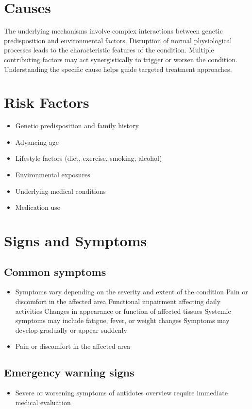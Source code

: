 \section{Causes}
The underlying mechanisms involve complex interactions between genetic predisposition and environmental factors. Disruption of normal physiological processes leads to the characteristic features of the condition. Multiple contributing factors may act synergistically to trigger or worsen the condition. Understanding the specific cause helps guide targeted treatment approaches.
\section{Risk Factors}


\begin{itemize}[noitemsep]
  \item Genetic predisposition and family history
  \item Advancing age
  \item Lifestyle factors (diet, exercise, smoking, alcohol)
  \item Environmental exposures
  \item Underlying medical conditions
  \item Medication use
\end{itemize}
\section{Signs and Symptoms}

\subsection{Common symptoms}
\begin{itemize}[noitemsep]
  \item Symptoms vary depending on the severity and extent of the condition Pain or discomfort in the affected area Functional impairment affecting daily activities Changes in appearance or function of affected tissues Systemic symptoms may include fatigue, fever, or weight changes Symptoms may develop gradually or appear suddenly
  \item Pain or discomfort in the affected area
  \end{itemize}

\subsection{Emergency warning signs}
\begin{itemize}[noitemsep]
  \item Severe or worsening symptoms of antidotes overview require immediate medical evaluation
\end{itemize}
